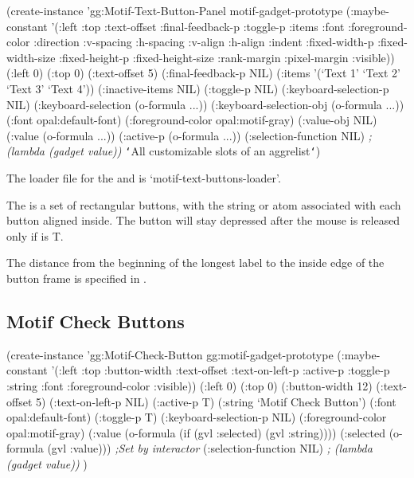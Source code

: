 \begin{group}
\begin{programexample}
(create-instance 'gg:Motif-Text-Button-Panel motif-gadget-prototype
   (:maybe-constant '(:left :top :text-offset :final-feedback-p :toggle-p :items :font
                      :foreground-color :direction :v-spacing :h-spacing :v-align
                      :h-align :indent :fixed-width-p :fixed-width-size :fixed-height-p
                      :fixed-height-size :rank-margin :pixel-margin :visible))
   (:left 0)
   (:top 0)
   (:text-offset 5)
   (:final-feedback-p NIL)
   (:items '(`Text 1' `Text 2' `Text 3' `Text 4'))
   (:inactive-items NIL)
   (:toggle-p NIL)
   (:keyboard-selection-p NIL)
   (:keyboard-selection (o-formula ...))
   (:keyboard-selection-obj (o-formula ...))
   (:font opal:default-font)
   (:foreground-color opal:motif-gray)
   (:value-obj NIL)
   (:value (o-formula ...))
   (:active-p (o-formula ...))
   (:selection-function NIL)   {\it ; (lambda (gadget value))}
   {\tt\char`\<}All customizable slots of an aggrelist{\tt\char`\>})
\end{programexample}
\end{group}

The loader file for the  and 
is `motif-text-buttons-loader'.

The  is a set of rectangular buttons, with the
string or atom associated with each button aligned inside.
The button will stay depressed after the mouse
is released only if  is T.

The distance from the beginning of the longest label to the inside edge of the
button frame is specified in .

\begin{group}
\subsection{Motif Check Buttons}
\label{motif-check-buttons}

\begin{programexample}
(create-instance 'gg:Motif-Check-Button gg:motif-gadget-prototype
   (:maybe-constant '(:left :top :button-width :text-offset :text-on-left-p
		      :active-p :toggle-p :string :font :foreground-color :visible))
   (:left 0)
   (:top 0)
   (:button-width 12)
   (:text-offset 5)
   (:text-on-left-p NIL)
   (:active-p T)
   (:string `Motif Check Button')
   (:font opal:default-font)
   (:toggle-p T)
   (:keyboard-selection-p NIL)
   (:foreground-color opal:motif-gray)
   (:value (o-formula (if (gvl :selected) (gvl :string))))
   (:selected (o-formula (gvl :value))) {\it ;Set by interactor}
   (:selection-function NIL)   {\it ; (lambda (gadget value))}
   )
\end{programexample}
\end{group}
\vspace{1 line}


